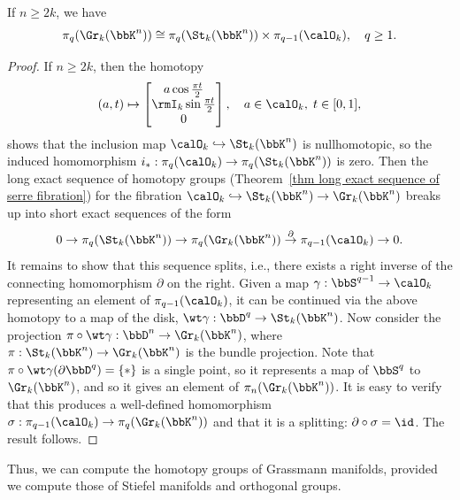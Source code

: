 \begin{prop}\label{prop 10.9.5 Shastri}
    If $n\geq 2k$, we have
    \[\pi_q(\Gr_k(\bbK^n))\cong \pi_q(\St_k(\bbK^n))\times \pi_{q-1}(\calO_k),\quad q\geq 1.\]
\end{prop}
\begin{proof}
    If $n\geq 2k$, then the homotopy
    \[(a,t)\mapsto \begin{bmatrix}
    a\cos\frac{\pi t}{2}\\
    \rmI_k \sin\frac{\pi t}{2}\\
    0
    \end{bmatrix},\quad a\in\calO_k,\; t\in [0,1],\]
    shows that the inclusion map $\calO_k\hookrightarrow \St_{k}(\bbK^n)$ is nullhomotopic, so the induced homomorphism $i_\ast:\pi_q(\calO_k)\to \pi_q(\St_k(\bbK^n))$ is zero. Then the long exact sequence of homotopy groups (Theorem~\ref{thm long exact sequence of serre fibration}) for the fibration $\calO_k\hookrightarrow \St_k(\bbK^n)\to \Gr_k(\bbK^n)$ breaks up into short exact sequences of the form
    \[0\to \pi_q(\St_k(\bbK^n))\to \pi_q(\Gr_k(\bbK^n))\overset{\partial}{\to} \pi_{q-1}(\calO_k)\to 0.\]
    It remains to show that this sequence splits, i.e., there exists a right inverse of the connecting homomorphism $\partial$ on the right. Given a map $\gamma:\bbS^{q-1}\to \calO_k$ representing an element of $\pi_{q-1}(\calO_k)$, it can be continued via the above homotopy to a map of the disk, $\wt \gamma:\bbD^{q}\to \St_k(\bbK^n)$. Now consider the projection $\pi\circ \wt\gamma:\bbD^n\to \Gr_k(\bbK^n)$, where $\pi:\St_k(\bbK^n)\to \Gr_k(\bbK^n)$ is the bundle projection. Note that $\pi\circ\wt \gamma(\partial\bbD^q)=\{\ast \}$ is a single point, so it represents a map of $\bbS^q$ to $\Gr_k(\bbK^n)$, and so it gives an element of $\pi_n(\Gr_k(\bbK^n))$. It is easy to verify that this produces a well-defined homomorphism $\sigma:\pi_{q-1}(\calO_k)\to \pi_q(\Gr_k(\bbK^n))$ and that it is a splitting: $\partial\circ\sigma=\id$. The result follows.
\end{proof}

Thus, we can compute the homotopy groups of Grassmann manifolds, provided we compute those of Stiefel manifolds and orthogonal groups. 

